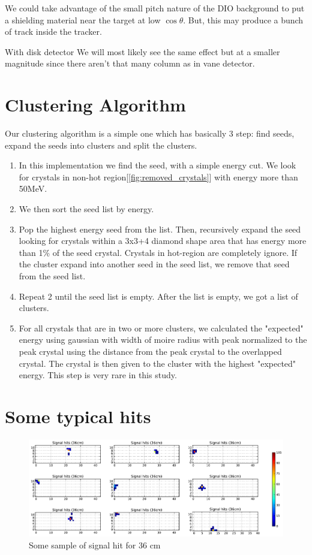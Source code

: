 \documentclass[11pt]{article}
\begin{document}
We could take advantage of the small pitch nature of the DIO background to put a shielding material near the target at low $\cos \theta$. But, this may produce a bunch of track inside the tracker.

With disk detector We will most likely see the same effect but at a smaller magnitude since there aren't that many column as in vane detector. 
\clearpage
\appendix
\section{Clustering Algorithm}
\label{sec:clustering_algorithm}
Our clustering algorithm is a simple one which has basically 3 step: find seeds, expand the seeds into clusters and split the clusters.
\begin{enumerate}
\item In this implementation we find the seed, with a simple energy cut. We look for crystals in non-hot region[\ref{fig:removed_crystals}] with energy more than 50MeV.
\item We then sort the seed list by energy.
\item Pop the highest energy seed from the list. Then, recursively expand the seed looking for crystals within a 3x3+4 diamond shape area that has energy more than 1\% of the seed crystal. Crystals in hot-region are completely ignore. If the cluster expand into another seed in the seed list, we remove that seed from the seed list.
\item Repeat 2 until the seed list is empty. After the list is empty, we got a list of clusters.
\item For all crystals that are in two or more clusters, we calculated the "expected" energy using gaussian with width of moire radius with peak normalized to the peak crystal using the distance from the peak crystal to the overlapped crystal. The crystal is then given to the cluster with the highest "expected" energy. This step is very rare in this study. 
\end{enumerate}
\clearpage
\section{Some typical hits}
\label{sec:typical_hit}

\begin{figure}[htbp]
   \centering
   \includegraphics[width=\textwidth]{../plot/sig_sample_hit_36.pdf} %
   \caption{Some sample of signal hit for 36 cm}
   \label{fig:sig_sample_hit_36}
\end{figure}
\end{document}
